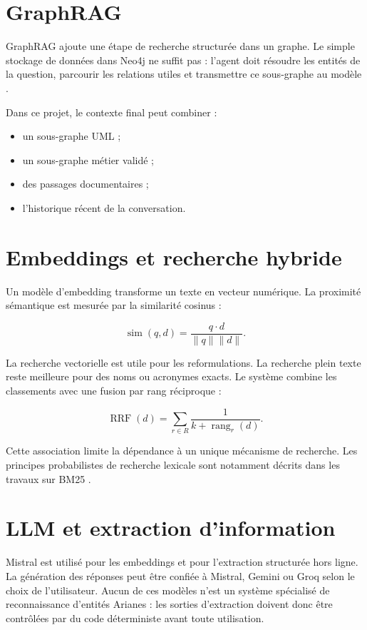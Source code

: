\section{GraphRAG}

GraphRAG ajoute une étape de recherche structurée dans un graphe. Le simple stockage de données dans Neo4j ne suffit pas : l'agent doit résoudre les entités de la question, parcourir les relations utiles et transmettre ce sous-graphe au modèle \cite{edge2024graphrag}.

Dans ce projet, le contexte final peut combiner :

\begin{itemize}
  \item un sous-graphe UML ;
  \item un sous-graphe métier validé ;
  \item des passages documentaires ;
  \item l'historique récent de la conversation.
\end{itemize}

\section{Embeddings et recherche hybride}

Un modèle d'embedding transforme un texte en vecteur numérique. La proximité sémantique est mesurée par la similarité cosinus :

\begin{equation}
\operatorname{sim}(q,d)=\frac{q\cdot d}{\lVert q\rVert\lVert d\rVert}.
\end{equation}

La recherche vectorielle est utile pour les reformulations. La recherche plein texte reste meilleure pour des noms ou acronymes exacts. Le système combine les classements avec une fusion par rang réciproque :

\begin{equation}
\operatorname{RRF}(d)=\sum_{r\in R}\frac{1}{k+\operatorname{rang}_r(d)}.
\end{equation}

Cette association limite la dépendance à un unique mécanisme de recherche. Les principes probabilistes de recherche lexicale sont notamment décrits dans les travaux sur BM25 \cite{robertson2009bm25}.

\section{LLM et extraction d'information}

Mistral est utilisé pour les embeddings et pour l'extraction structurée hors ligne. La génération des réponses peut être confiée à Mistral, Gemini ou Groq selon le choix de l'utilisateur. Aucun de ces modèles n'est un système spécialisé de reconnaissance d'entités Arianes : les sorties d'extraction doivent donc être contrôlées par du code déterministe avant toute utilisation.
